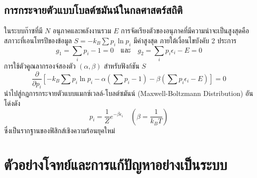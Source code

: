 \subsection{การกระจายตัวแบบโบลต์ซมันน์ในกลศาสตร์สถิติ}
ในระบบก๊าซที่มี $N$ อนุภาคและพลังงานรวม $E$ การจัดเรียงตัวของอนุภาคที่มีความน่าจะเป็นสูงสุดคือสภาวะที่เอนโทรปีของข้อมูล $S = -k_B \sum p_i \ln p_i$ มีค่าสูงสุด ภายใต้เงื่อนไขบังคับ 2 ประการ
\begin{equation}
g_1 = \sum_{i} p_i - 1 = 0 \quad \text{และ} \quad g_2 = \sum_{i} p_i \epsilon_i - E = 0
\end{equation}
การใช้ตัวคูณลากรองจ์สองตัว $(\alpha, \beta)$ สำหรับฟังก์ชัน $S$
\begin{equation}
\frac{\partial}{\partial p_i} \left[ -k_B \sum p_i \ln p_i - \alpha\left(\sum p_i - 1\right) - \beta\left(\sum p_i \epsilon_i - E\right) \right] = 0
\end{equation}
นำไปสู่กฎการกระจายตัวแบบแมกซ์เวลล์-โบลต์ซมันน์ (Maxwell-Boltzmann Distribution) อันโด่งดัง
\begin{equation}
p_i = \frac{1}{Z} e^{-\beta \epsilon_i} \quad \left(\beta = \frac{1}{k_B T}\right)
\end{equation}
ซึ่งเป็นรากฐานของฟิสิกส์เชิงความร้อนยุคใหม่

\section{ตัวอย่างโจทย์และการแก้ปัญหาอย่างเป็นระบบ}

